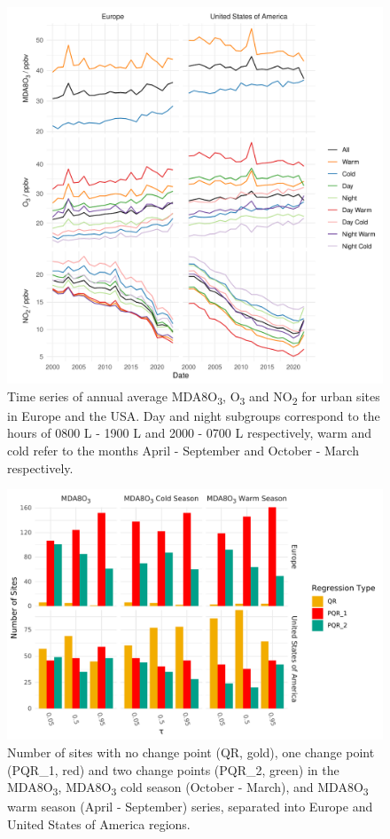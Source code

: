 \documentclass[journal abbreviation, manuscript]{copernicus}
\begin{document}
\clearpage


\begin{figure}[p]
\includegraphics[width=12cm]{figures/paper_figures/f01_overview.pdf}
\caption{Time series of annual average MDA8O\textsubscript{3}, O\textsubscript{3} and NO\textsubscript{2} for urban sites in Europe and the USA. Day and night subgroups correspond to the hours of 0800 L - 1900 L and 2000 - 0700 L respectively, warm and cold refer to the months April - September and October - March respectively.}
\label{fig:conc_plot}
\end{figure}
\clearpage

\begin{figure}[p]
\includegraphics[width=12cm]{figures/paper_figures/f02_regression_type_bars_o3.pdf}
\caption{Number of sites with no change point (QR, gold), one change point (PQR\_1, red) and two change points (PQR\_2, green) in the MDA8O\textsubscript{3}, MDA8O\textsubscript{3} cold season (October - March), and MDA8O\textsubscript{3} warm season (April - September) series, separated into Europe and United States of America regions.}
\label{fig:regression_type}
\end{figure}
\clearpage
\end{document}
